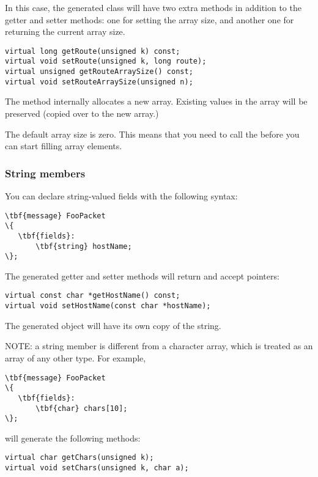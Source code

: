 In this case, the generated class will have two extra methods in addition
to the getter and setter methods: one for setting the array size, and another
one for returning the current array size.

\begin{verbatim}
virtual long getRoute(unsigned k) const;
virtual void setRoute(unsigned k, long route);
virtual unsigned getRouteArraySize() const;
virtual void setRouteArraySize(unsigned n);
\end{verbatim}

The  method internally allocates a new array. Existing
values in the array will be preserved (copied over to the new array.)

The default array size is zero. This means that you need to call the
 before you can start filling array elements.


\subsubsection{String members}

You can declare string-valued fields with the following syntax:

\begin{Verbatim}[commandchars=\\\{\}]
\tbf{message} FooPacket
\{
   \tbf{fields}:
       \tbf{string} hostName;
\};
\end{Verbatim}

The generated getter and setter methods will return and accept 
pointers:

\begin{verbatim}
virtual const char *getHostName() const;
virtual void setHostName(const char *hostName);
\end{verbatim}

The generated object will have its own copy of the string.

NOTE: a string member is different from a character array,
which is treated as an array of any other type. For example,

\begin{Verbatim}[commandchars=\\\{\}]
\tbf{message} FooPacket
\{
   \tbf{fields}:
       \tbf{char} chars[10];
\};
\end{Verbatim}

will generate the following methods:

\begin{verbatim}
virtual char getChars(unsigned k);
virtual void setChars(unsigned k, char a);
\end{verbatim}


